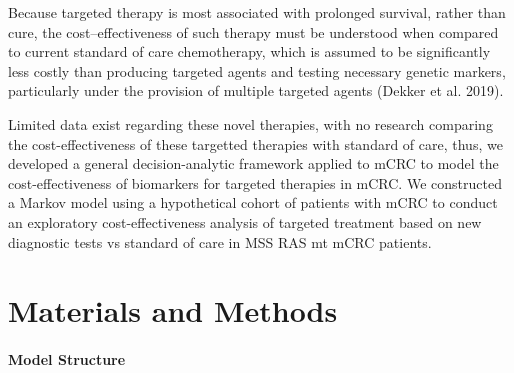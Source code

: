 \documentclass[
]{article}
\begin{document}
Because targeted therapy is most associated with prolonged survival,
rather than cure, the cost--effectiveness of such therapy must be
understood when compared to current standard of care chemotherapy, which
is assumed to be significantly less costly than producing targeted
agents and testing necessary genetic markers, particularly under the
provision of multiple targeted agents (Dekker et al. 2019).

Limited data exist regarding these novel therapies, with no research
comparing the cost-effectiveness of these targetted therapies with
standard of care, thus, we developed a general decision-analytic
framework applied to mCRC to model the cost-effectiveness of biomarkers
for targeted therapies in mCRC. We constructed a Markov model using a
hypothetical cohort of patients with mCRC to conduct an exploratory
cost-effectiveness analysis of targeted treatment based on new
diagnostic tests vs standard of care in MSS RAS mt mCRC patients.

\hypertarget{materials-and-methods}{%
\section{Materials and Methods}\label{materials-and-methods}}

\hypertarget{model-structure}{%
\paragraph{Model Structure}\label{model-structure}}
\end{document}
